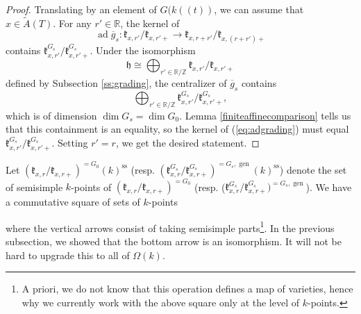 \documentclass[12pt]{article}
\newcommand{\on}{\operatorname}
\theoremstyle{remark}
\begin{document}
\begin{proof}
Translating by an element of $G(k((t))$, we can assume that $x\in\widetilde{A}(T).$ For any $r'\in\mathbb{R}$, the kernel of
\begin{equation}\label{eq:adgrading}
\on{ad}\overline{g}_s:\mathfrak{k}_{x,r'}/\mathfrak{k}_{x,r'+}\rightarrow\mathfrak{k}_{x,r+r'}/\mathfrak{k}_{x,(r+r')+}
\end{equation}
contains $\mathfrak{k}_{x,r'}^{G_s}/\mathfrak{k}_{x,r'+}^{G_s}$. Under the isomorphism
\[
\mathfrak{h}\cong\displaystyle\bigoplus_{r'\in\mathbb{R}/\mathbb{Z}}\mathfrak{k}_{x,r'}/\mathfrak{k}_{x,r'+}
\]
defined by Subsection \ref{ss:grading}, the centralizer of $\overline{g}_s$ contains
\[
\displaystyle\bigoplus_{r'\in\mathbb{R}/\mathbb{Z}}\mathfrak{k}_{x,r'}^{G_s}/\mathfrak{k}_{x,r'+}^{G_s},
\]
which is of dimension $\dim G_s=\dim G_0.$ Lemma \ref{finiteaffinecomparison} tells us that this containment is an equality, so the kernel of (\ref{eq:adgrading}) must equal $\mathfrak{k}_{x,r'}^{G_s}/\mathfrak{k}_{x,r'+}^{G_s}$. Setting $r'=r$, we get the desired statement.
\end{proof}

Let $(\mathfrak{k}_{x,r}/\mathfrak{k}_{x,r+})^{=G_0}(k)^{\on{ss}}$ (resp. $(\mathfrak{k}_{x,r}^{G_s}/\mathfrak{k}_{x,r+}^{G_s})^{=G_s,\on{gen}}(k)^{\on{ss}}$) denote the set of semisimple $k$-points of $(\mathfrak{k}_{x,r}/\mathfrak{k}_{x,r+})^{=G_0}$ (resp. ($\mathfrak{k}_{x,r}^{G_s}/\mathfrak{k}_{x,r+}^{G_s})^{=G_s,\on{gen}}$). We have a commutative square of sets of $k$-points
\begin{center}
\end{center}
where the vertical arrows consist of taking semisimple parts\footnote{A priori, we do not know that this operation defines a map of varieties, hence why we currently work with the above square only at the level of $k$-points.}. In the previous subsection, we showed that the bottom arrow is an isomorphism. It will not be hard to upgrade this to all of $\Omega(k)$.
\end{document}
